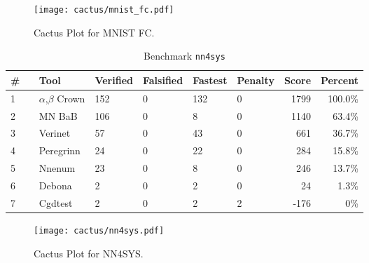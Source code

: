 \begin{figure}[h]
\centerline{\texttt{[image: cactus/mnist\_fc.pdf]}}
\caption{Cactus Plot for MNIST FC.}
\label{fig:quantPic}
\end{figure}



\begin{table}[h]
\begin{center}
\caption{Benchmark \texttt{nn4sys}} \label{tab:cat_{cat}}
{\setlength{\tabcolsep}{2pt}
\begin{tabular}[h]{@{}llllllrr@{}}
\toprule
\textbf{\# ~} & \textbf{Tool} & \textbf{Verified} & \textbf{Falsified} & \textbf{Fastest} & \textbf{Penalty} & \textbf{Score} & \textbf{Percent}\\
\midrule
1 & $\alpha$,$\beta$ Crown & 152 & 0 & 132 & 0 & 1799 & 100.0\% \\
2 & MN BaB & 106 & 0 & 8 & 0 & 1140 & 63.4\% \\
3 & Verinet & 57 & 0 & 43 & 0 & 661 & 36.7\% \\
4 & Peregrinn & 24 & 0 & 22 & 0 & 284 & 15.8\% \\
5 & Nnenum & 23 & 0 & 8 & 0 & 246 & 13.7\% \\
6 & Debona & 2 & 0 & 2 & 0 & 24 & 1.3\% \\
7 & Cgdtest & 2 & 0 & 2 & 2 & -176 & 0\% \\
\bottomrule
\end{tabular}
}
\end{center}
\end{table}



\begin{figure}[h]
\centerline{\texttt{[image: cactus/nn4sys.pdf]}}
\caption{Cactus Plot for NN4SYS.}
\label{fig:quantPic}
\end{figure}



